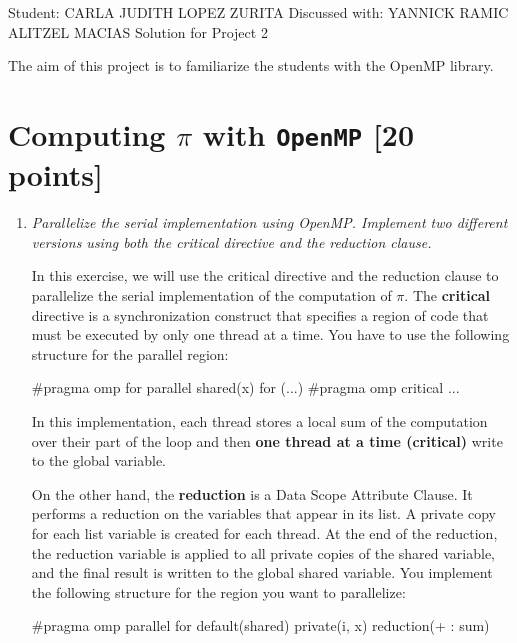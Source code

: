 \documentclass[unicode,11pt,a4paper,oneside,numbers=endperiod,openany]{scrartcl}
\begin{document}
\setassignment
{}

            {Student: CARLA JUDITH LOPEZ ZURITA}
            {Discussed with: YANNICK RAMIC \\
            \hspace*{370pt}ALITZEL MACIAS}
{Solution for Project 2}{}
\newline

The aim of this project is to familiarize the students with the OpenMP library.
\section{Computing $\pi$ with \texttt{OpenMP} [20 points]}

\begin{enumerate}
    \item \textit{Parallelize the serial implementation using OpenMP. 
    Implement two different versions using both the critical directive and the
    reduction clause.}

    In this exercise, we will use the critical directive and the reduction
    clause to parallelize the serial implementation of the computation of $\pi$.
    The \textbf{critical} directive is a synchronization construct that
    specifies a region of code that must be executed by only one thread at a
    time. \cite{hpc-tutorials-llnl-critical}
    You have to use the following structure for the parallel region:
    \begin{cppverbatim}
#pragma omp for parallel shared(x) 
for (...){
  #pragma omp critical 
  ...
}
    \end{cppverbatim}

    In this implementation, each thread stores a local sum of the computation over their part of the
    loop and then \textbf{one thread at a time (critical)} write to the global variable.

    On the other hand, the \textbf{reduction} is a Data Scope Attribute
    Clause. It performs a reduction on the variables that appear in its list.
    A private copy for each list variable is created for each thread. At the end
    of the reduction, the reduction variable is applied to all private copies of
    the shared variable, and the final result is written to the global shared
    variable. \cite{hpc-tutorials-llnl-reduction}
    You implement the following structure for the region you want to parallelize:
    \begin{cppverbatim}
#pragma omp parallel for default(shared) private(i, x) reduction(+ : sum)
    \end{cppverbatim}


\end{enumerate}
\end{document}
